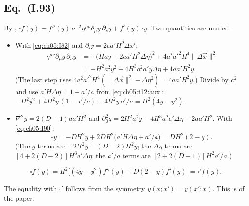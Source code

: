 \subsection[Eq. (I.93)]{Eq.~(I.93) \tD}
\label{sec:ch05:t12:93}

By , $\square f(y)=f''(y)\,a^{-2}\eta^{\mu\nu}\partial_\mu y\,\partial_\nu y+f'(y)\,\square y$. Two quantities are needed.
\begin{itemize}[leftmargin=14pt]
\item With \eqref{eq:ch05:I82} and $\partial_iy=2aa'H^2\Delta x^i$:
\begin{equation*}
\begin{aligned}
\eta^{\mu\nu}\partial_\mu y\,\partial_\nu y&=-\big(Hay-2aa'H^2\Delta\eta\big)^2+4a^2a'^2H^4\|\Delta\vec x\|^2\\
&=-H^2a^2y^2+4H^3a^2a'y\Delta\eta+4aa'H^2y .
\end{aligned}
\end{equation*}
(The last step uses $4a^2a'^2H^4(\|\Delta\vec x\|^2-\Delta\eta^2)=4aa'H^2y$.)
Divide by $a^2$ and use $a'H\Delta\eta=1-a'/a$ from \eqref{eq:ch05:t12:aux}:
$-H^2y^2+4H^2y\,(1-a'/a)+4H^2y\,a'/a=H^2(4y-y^2)$.
\item $\nabla^2y=2(D-1)aa'H^2$ and $\partial_0^2y=2H^2a^2y-4H^3a^2a'\Delta\eta-2aa'H^2$. With \eqref{eq:ch05:I90}:
\begin{equation*}
\square y=-DH^2y+2DH^2\big(a'H\Delta\eta+a'/a\big)=DH^2(2-y).
\end{equation*}
(The $y$ terms are $-2H^2y-(D-2)H^2y$; the $\Delta\eta$ terms are $[4+2(D-2)]H^3a'\Delta\eta$; the $a'/a$ terms are $[2+2(D-1)]H^2a'/a$.)
\end{itemize}
\begin{resultbox}
\begin{equation}
\square f(y)=H^2\big[(4y-y^2)f''(y)+D(2-y)f'(y)\big]=\square'f(y).
\tag{I.93}\label{eq:ch05:I93}
\end{equation}
\end{resultbox}
\noindent The equality with $\square'$ follows from the symmetry $y(x;x')=y(x';x)$. This is  of the paper.

